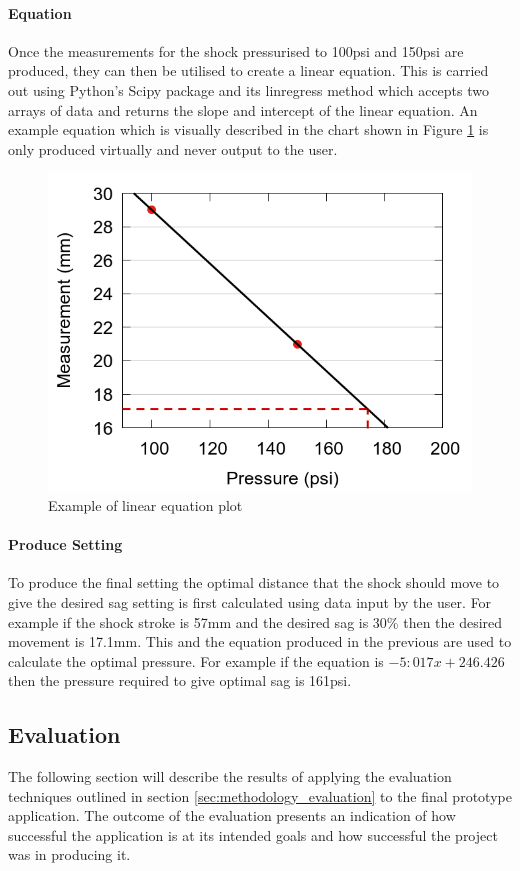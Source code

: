 		\paragraph{Equation}
			Once the measurements for the shock pressurised to 100psi and 150psi are produced, they can then be utilised to create a linear equation. This is carried out using Python’s Scipy package and its linregress method which accepts two arrays of data and returns the slope and intercept of the linear equation. An example equation which is visually described in the chart shown in Figure \ref{fig:equation_plot} is only produced virtually and never output to the user.
			\begin{figure}[h!]
				\centering
				\includegraphics[scale=0.4]{../images/results/scatter_dotted.png}
				\caption{Example of linear equation plot}
				\label{fig:equation_plot}
			\end{figure}
		\paragraph{Produce Setting}
			To produce the final setting the optimal distance that the shock should move to give the desired sag setting is first calculated using data input by the user. For example if the shock stroke is 57mm and the desired sag is 30\% then the desired movement is 17.1mm. This and  the equation produced in the  previous are used to calculate the optimal pressure.   For example if the equation is $-5:017x+246.426$ then the pressure required to give optimal sag is 161psi.
\clearpage
	\subsection{Evaluation}\label{sec:evaluation}
		The following section will describe the results of applying the evaluation techniques outlined in section \ref{sec:methodology_evaluation} to the final prototype application. The outcome of the evaluation presents an indication of how successful the application is at its intended goals and how successful the project was in producing it.
